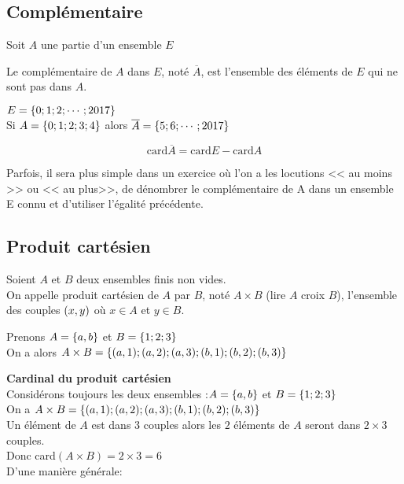 \subsection*{Complémentaire}
Soit  $ A $ une partie d'un ensemble  $ E $
\begin{definition}
 Le  complémentaire de $ A $ dans $ E $,  noté $ \overline{A} $, est l'ensemble des éléments  de $ E $ qui ne sont pas dans $ A. $
 
 \end{definition}
\begin{example}
$ E=\left\{0;1;2; \cdots ; 2017\right\} $\\
Si $ A=\left\{0;1;2;3; 4\right\} $ alors  $ \overline{A}=\left\{5;6;\cdots ;2017\right\} $ 
\end{example}


\begin{property}
\[ \textrm{card} \overline{A} = \textrm{card}E - \textrm{card}A  \]
\end{property}
 Parfois, il sera plus simple dans un exercice où l'on a les locutions << au moins >> ou << au plus>>, de dénombrer le complémentaire de  A dans un ensemble   E connu et d'utiliser l'égalité précédente.

\subsection*{Produit cartésien}
\begin{definition}
Soient $A $ et  $B $ deux ensembles finis non vides.\\
On appelle  produit cartésien de $ A$ par $B $, noté $A\times B$  (lire $ A $ croix $ B $), l'ensemble des couples $ \left(x, y\right) $ où $x\in A $ et $y\in B. $
\end{definition}
\begin{example}

Prenons $ A=\left\{a, b\right\} $ et $ B= \left\{1; 2; 3\right\} $\\
On a alors $ A\times B=\left\{(a, 1); (a, 2);(a,3);(b,1);(b,2);(b,3)  \right\} $
\end{example}
\textbf{Cardinal du produit cartésien}\\
Considérons toujours  les deux ensembles :\;$ A=\left\{a, b\right\} $ et $ B= \left\{1; 2; 3\right\} $\\
On a $ A\times B=\left\{(a, 1); (a, 2);(a,3);(b,1);(b,2);(b,3)  \right\} $\\
Un élément de $ A $ est dans $ 3 $ couples alors les $ 2 $ éléments de $ A $ seront dans $ 2\times 3 $ couples.\\  Donc card$( A \times B) = 2\times 3 =6$\\ D'une manière générale:

